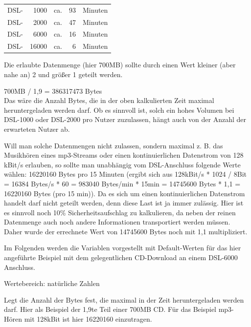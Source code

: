 \begin{description}
\begin{tabular}{lrlrl}
    DSL-&1000 & ca.& 93 & Minuten \\
    DSL-&2000 & ca.& 47 & Minuten \\
    DSL-&6000 & ca.& 16 & Minuten \\
    DSL-&16000 & ca.& 6 & Minuten \\
    
   \end{tabular}

   Die erlaubte Datenmenge (hier 700MB) sollte durch einen Wert kleiner (aber nahe an) 2 und größer 1 geteilt werden.
 
    700MB / 1,9 = 386317473 Bytes \\
   Das wäre die Anzahl Bytes, die in der oben kalkulierten Zeit maximal heruntergeladen werden darf. Ob es
   sinnvoll ist, solch ein hohes Volumen bei DSL-1000 oder DSL-2000 pro Nutzer zuzulassen, hängt auch von
   der Anzahl der erwarteten Nutzer ab.

   Will man solche Datenmengen nicht zulassen, sondern maximal z. B. das Musikhören eines mp3-Streams oder
   einen kontinuierlichen Datenstrom von 128 kBit/s erlauben, so sollte man unabhängig vom DSL-Anschluss
   folgende Werte wählen: 16220160 Bytes pro 15 Minuten (ergibt sich aus 128kBit/s * 1024 / 8Bit = 16384
   Bytes/s * 60 = 983040 Bytes/min * 15min = 14745600 Bytes * 1,1 = 16220160 Bytes (pro 15 min)).
   Da es sich um einen kontinuierlichen Datenstrom handelt darf nicht geteilt werden, denn diese Last ist
   ja immer zulässig. Hier ist es sinnvoll noch 10\% Sicherheitsaufschlag zu kalkulieren, da neben der
   reinen Datenmenge auch noch andere Informationen transportiert werden müssen. Daher wurde der errechnete
   Wert von 14745600 Bytes noch mit 1,1 multipliziert.

   Im Folgenden werden die Variablen vorgestellt mit Default-Werten für das hier angeführte Beispiel mit dem
   gelegentlichen CD-Download an einem DSL-6000 Anschluss.
   
   
   
   Wertebereich: natürliche Zahlen
   
   Legt die Anzahl der Bytes fest, die maximal in der Zeit 
   {} heruntergeladen werden darf. Hier als Beispiel der 1,9te Teil einer
   700MB CD. Für das Beispiel mp3-Hören mit 128kBit ist hier 16220160 einzutragen.
   

\end{description}
